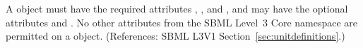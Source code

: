 A \Unit object must have the required attributes ,
,  and , and may have the
optional attributes  and .  No other
attributes from the SBML Level~3 Core namespace are permitted on a \Unit
object.  (References: SBML L3V1 Section~\ref{sec:unitdefinitions}.)
